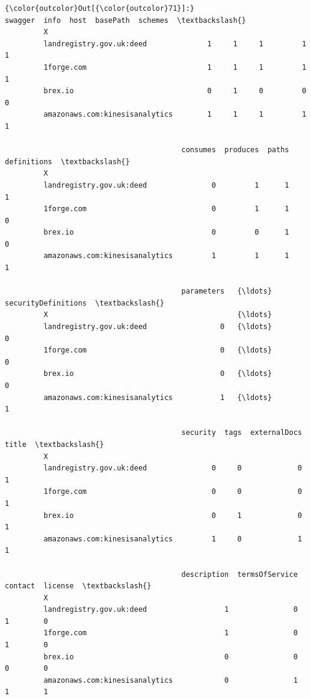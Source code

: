 \documentclass[11pt]{article}
\begin{document}
\begin{Verbatim}[commandchars=\\\{\}]
{\color{outcolor}Out[{\color{outcolor}71}]:}                                 swagger  info  host  basePath  schemes  \textbackslash{}
         X                                                                        
         landregistry.gov.uk:deed              1     1     1         1        1   
         1forge.com                            1     1     1         1        1   
         brex.io                               0     1     0         0        0   
         amazonaws.com:kinesisanalytics        1     1     1         1        1   
         
                                         consumes  produces  paths  definitions  \textbackslash{}
         X                                                                        
         landregistry.gov.uk:deed               0         1      1            1   
         1forge.com                             0         1      1            0   
         brex.io                                0         0      1            0   
         amazonaws.com:kinesisanalytics         1         1      1            1   
         
                                         parameters   {\ldots}     securityDefinitions  \textbackslash{}
         X                                            {\ldots}                           
         landregistry.gov.uk:deed                 0   {\ldots}                       0   
         1forge.com                               0   {\ldots}                       0   
         brex.io                                  0   {\ldots}                       0   
         amazonaws.com:kinesisanalytics           1   {\ldots}                       1   
         
                                         security  tags  externalDocs  title  \textbackslash{}
         X                                                                     
         landregistry.gov.uk:deed               0     0             0      1   
         1forge.com                             0     0             0      1   
         brex.io                                0     1             0      1   
         amazonaws.com:kinesisanalytics         1     0             1      1   
         
                                         description  termsOfService  contact  license  \textbackslash{}
         X                                                                               
         landregistry.gov.uk:deed                  1               0        1        0   
         1forge.com                                1               0        1        0   
         brex.io                                   0               0        0        0   
         amazonaws.com:kinesisanalytics            0               1        1        1   
         

\end{Verbatim}
\end{document}
